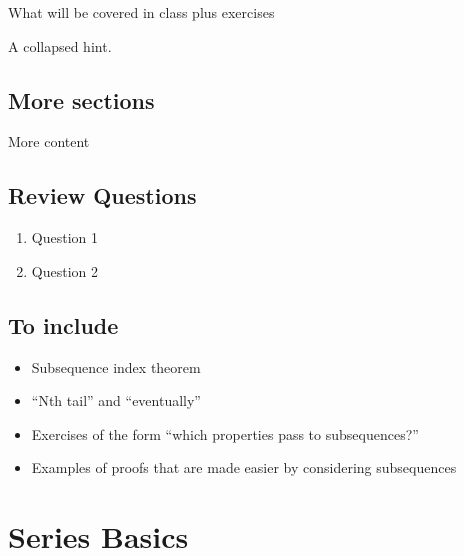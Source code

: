 \documentclass[
  letterpaper,
  DIV=11,
  numbers=noendperiod]{scrreprt}
\providecommand{\tightlist}{%
  \setlength{\itemsep}{0pt}\setlength{\parskip}{0pt}}
\theoremstyle{plain}
\theoremstyle{definition}
\theoremstyle{plain}
\theoremstyle{plain}
\theoremstyle{definition}
\theoremstyle{definition}
\theoremstyle{remark}
\begin{document}
What will be covered in class plus exercises

\begin{tcolorbox}[enhanced jigsaw, titlerule=0mm, opacitybacktitle=0.6, leftrule=.75mm, bottomrule=.15mm, left=2mm, arc=.35mm, colback=white, rightrule=.15mm, colframe=quarto-callout-tip-color-frame, toptitle=1mm, breakable, opacityback=0, colbacktitle=quarto-callout-tip-color!10!white, bottomtitle=1mm, title=\textcolor{quarto-callout-tip-color}{\faLightbulb}\hspace{0.5em}{Hint}, coltitle=black, toprule=.15mm]

A collapsed hint.

\end{tcolorbox}

\section{More sections}\label{more-sections}

More content

\section*{Review Questions}\label{review-questions-9}


\begin{enumerate}
\def\labelenumi{\arabic{enumi}.}
\tightlist
\item
  Question 1
\item
  Question 2
\end{enumerate}

\section{To include}\label{to-include-2}

\begin{itemize}
\tightlist
\item
  Subsequence index theorem
\item
  ``Nth tail'' and ``eventually''
\item
  Exercises of the form ``which properties pass to subsequences?''
\item
  Examples of proofs that are made easier by considering subsequences
\end{itemize}

\chapter{Series Basics}\label{series-basics}
\end{document}
